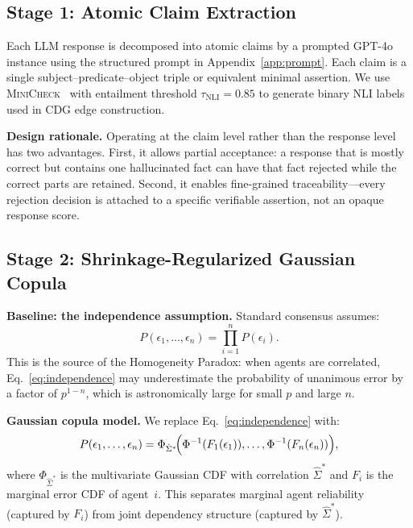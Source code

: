 \documentclass[conference]{IEEEtran}
\begin{document}
\subsection{Stage 1: Atomic Claim Extraction}
\label{sec:extraction}

Each LLM response is decomposed into atomic claims by a
prompted GPT-4o instance using the structured prompt in
Appendix~\ref{app:prompt}.
Each claim is a single subject--predicate--object triple or
equivalent minimal assertion.
We use \textsc{MiniCheck}~\cite{tang2024minicheck} with
entailment threshold $\tau_\text{NLI} = 0.85$ to generate
binary NLI labels used in CDG edge construction.

\textbf{Design rationale.}
Operating at the claim level rather than the response level
has two advantages.
First, it allows partial acceptance: a response that is
mostly correct but contains one hallucinated fact can have
that fact rejected while the correct parts are retained.
Second, it enables fine-grained traceability---every rejection
decision is attached to a specific verifiable assertion,
not an opaque response score.

\subsection{Stage 2: Shrinkage-Regularized Gaussian Copula}
\label{sec:copula}

\textbf{Baseline: the independence assumption.}
Standard consensus assumes:
\begin{equation}
  P(\epsilon_1, \ldots, \epsilon_n) = \prod_{i=1}^{n} P(\epsilon_i).
  \label{eq:independence}
\end{equation}
This is the source of the Homogeneity Paradox:
when agents are correlated, Eq.~\eqref{eq:independence} may
underestimate the probability of unanimous error by a factor
of $p^{1-n}$, which is astronomically large for small $p$ and
large $n$.

\textbf{Gaussian copula model.}
We replace Eq.~\eqref{eq:independence} with:
\begin{equation}
  P(\epsilon_1, \ldots, \epsilon_n) =
  \Phi_{\hat{\Sigma}^*}\!\Bigl(
    \Phi^{-1}(F_1(\epsilon_1)), \ldots,
    \Phi^{-1}(F_n(\epsilon_n))
  \Bigr),
  \label{eq:copula}
\end{equation}
where $\Phi_{\hat{\Sigma}^*}$ is the multivariate Gaussian CDF
with correlation $\hat{\Sigma}^*$ and $F_i$ is the marginal
error CDF of agent~$i$.
This separates marginal agent reliability (captured by $F_i$)
from joint dependency structure (captured by $\hat{\Sigma}^*$).
\end{document}
